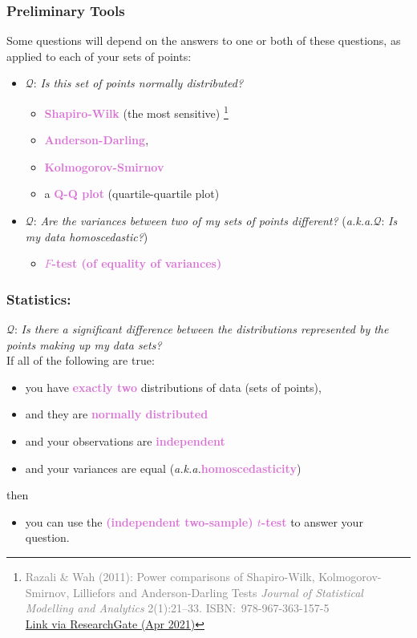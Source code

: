 \documentclass{beamer}
\newcommand{\aka}{\textit{a.k.a.}\xspace}
\newcommand{\key}[1]{\textcolor{orchid}{{\bf #1}}}
\newcommand{\kq}[1]{\textcolor{burntumber}{$\mathcal{Q}$: \emph{#1}}}
\begin{document}
\begin{frame}
\frametitle{Preliminary Tools}
Some questions will depend on the answers to one or both of
these questions, as applied to each of your sets of points:
\begin{itemize}
\item \kq{Is this set of points normally distributed?}
	\pause
	\begin{itemize}
	\item \key{Shapiro-Wilk} (the most sensitive)%
			\footnote{\textcolor{grey}{Razali \& Wah (2011):
					Power comparisons of Shapiro-Wilk, Kolmogorov-Smirnov, Lilliefors and Anderson-Darling Tests
					\emph{Journal of  Statistical Modelling and Analytics} 2(1):21--33. ISBN:~978-967-363-157-5\\ \href{https://www.researchgate.net/profile/Bee-Yap/publication/267205556_Power_Comparisons_of_Shapiro-Wilk_Kolmogorov-Smirnov_Lilliefors_and_Anderson-Darling_Tests/links/5477245b0cf29afed61446e1/Power-Comparisons-of-Shapiro-Wilk-Kolmogorov-Smirnov-Lilliefors-and-Anderson-Darling-Tests.pdf}{Link via ResearchGate (Apr 2021)}}}
	\item \key{Anderson-Darling},
	\item \key{Kolmogorov-Smirnov}
	\item a \key{Q-Q plot} (quartile-quartile plot)
	\end{itemize}
	\vspace{1em}\pause
\item \kq{Are the variances between two of my sets of points different?}
	(\aka \kq{Is my data homoscedastic?})
	\pause
	\begin{itemize}
	\item \key{$F$-test (of equality of variances)}
	\end{itemize}
\end{itemize}
\end{frame}

\begin{frame}
\frametitle{Statistics: }
\kq{Is there a significant difference between the distributions represented by the points making up my data sets?}\\
If all of the following are true:
\begin{itemize}
\item you have \key{exactly two} distributions of data (sets of points), \pause
\item and they are \key{normally distributed} \pause
\item and your observations are \key{independent} \pause
\item and your variances are equal (\aka \key{homoscedasticity}) \pause
\end{itemize}
then \pause
\begin{itemize}
\item you can use the \key{(independent two-sample) $t$-test}
to answer your question.
\end{itemize}
\end{frame}
\end{document}
